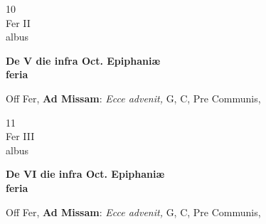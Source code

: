 \documentclass[10pt, openany]{book}
\begin{document}
        \begin{center}
            \begin{minipage}{3.5in}
                \vspace{2em}
                \begin{minipage}{0.5in}
                    {\Huge 10} \\
                    {\normalsize Fer II} \\
                    {\normalsize albus}
                \end{minipage}
                \begin{minipage}{3.0in}
                    \textbf{ \large De V die infra Oct. Epiphaniæ \\
                    \textnormal{\normalsize feria}} \\ 
                \end{minipage}
                \begin{justify}Off Fer, \textbf{Ad Missam}: \textit{Ecce advenit,} G, C, Pre Communis,  
                \end{justify}
            \end{minipage}
        \end{center}
    
        \begin{center}
            \begin{minipage}{3.5in}
                \vspace{2em}
                \begin{minipage}{0.5in}
                    {\Huge 11} \\
                    {\normalsize Fer III} \\
                    {\normalsize albus}
                \end{minipage}
                \begin{minipage}{3.0in}
                    \textbf{ \large De VI die infra Oct. Epiphaniæ \\
                    \textnormal{\normalsize feria}} \\ 
                \end{minipage}
                \begin{justify}Off Fer, \textbf{Ad Missam}: \textit{Ecce advenit,} G, C, Pre Communis,  
                \end{justify}
            \end{minipage}
        \end{center}
    
\end{document}
